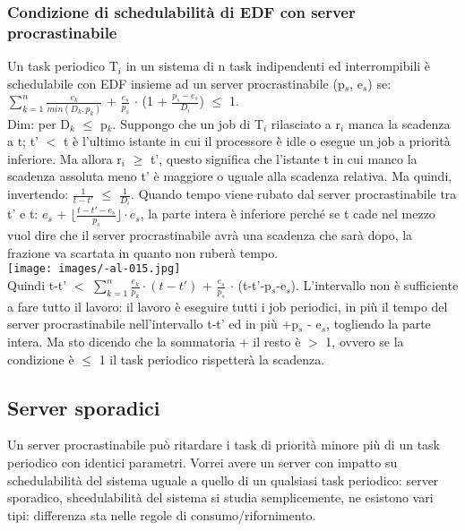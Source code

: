 \documentclass{article}
\begin{document}
\subsubsection{Condizione di schedulabilità di EDF con server procrastinabile}
Un task periodico T$_{i}$ in un sistema di n task indipendenti ed interrompibili è schedulabile con EDF insieme ad un server procrastinabile (p$_{s}$, e$_{s}$) se:\\ $\sum\limits_{k = 1}^{n} \frac{e_k}{min(D_k, p_k)}$ + $\frac{e_s}{p_s}$ $\cdot$ (1 + $\frac{p_s - e_s}{D_i}$) $\leq$ 1.\\ Dim: per D$_{k}$ $\leq$ p$_{k}$. Suppongo che un job di T$_{i}$ rilasciato a r$_{i}$ manca la scadenza a t; t' $<$ t è l'ultimo istante in cui il processore è idle o esegue un job a priorità inferiore. Ma allora r$_{i}$ $\geq$ t', questo significa che l'istante t in cui manco la scadenza assoluta meno t' è maggiore o uguale alla scadenza relativa. Ma quindi, invertendo: $\frac{1}{t-t'}$ $\leq$ $\frac{1}{D_i}$. Quando tempo viene rubato dal server procrastinabile tra t' e t: $e_{s}$ + $\lfloor \frac{t - t'- e_s}{p_s}\rfloor \cdot e_s$, la parte intera è inferiore perché se t cade nel mezzo vuol dire che il server procrastinabile avrà una scadenza che sarà dopo, la frazione va scartata in quanto non ruberà tempo.\\
\texttt{[image: images/-al-015.jpg]}\\
Quindi t-t' $<$ $\sum\limits_{k=1}^{n} \frac{e_k}{p_k} \cdot (t-t')$ + $\frac{e_s}{p_s}$ $\cdot$ (t-t'-p$_s$-e$_{s}$). L'intervallo non è sufficiente a fare tutto il lavoro: il lavoro è eseguire tutti i job periodici, in più il tempo del server procrastinabile nell'intervallo t-t' ed in più +p$_{s}$ - e$_{s}$, togliendo la parte intera. Ma sto dicendo che la sommatoria + il resto è $>$ 1, ovvero se la condizione è $\leq$ 1 il task periodico rispetterà la scadenza.
\subsection{Server sporadici}
Un server procrastinabile può ritardare i task di priorità minore più di un task periodico con identici parametri. Vorrei avere un server con impatto su schedulabilità del sistema uguale a quello di un qualsiasi task periodico: server sporadico, shcedulabilità del sistema si studia semplicemente, ne esistono vari tipi: differenza sta nelle regole di consumo/rifornimento.
\end{document}
